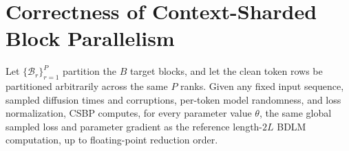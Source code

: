 \section{Correctness of Context-Sharded Block Parallelism}
\label{app:correctness}

\begin{proposition}
\label{prop:csbp-exactness}
Let $\{\mathcal{B}_r\}_{r=1}^{P}$ partition the $B$ target blocks, and let the
clean token rows be partitioned arbitrarily across the same $P$ ranks. Given
any fixed input sequence, sampled diffusion times and corruptions, per-token
model randomness, and loss normalization, CSBP computes, for every
parameter value $\theta$, the same global sampled loss and parameter gradient
as the reference length-$2L$ BDLM computation, up to floating-point reduction
order.
\end{proposition}

